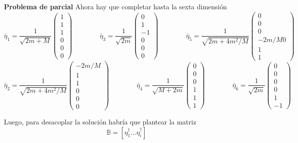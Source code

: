 \documentclass[10pt,oneside]{CBFT_book}
\begin{document}
\begin{ejemplo}{\bf Problema de parcial}
Ahora hay que completar hasta la sexta dimensión
\[
	\bar{\eta}_1 = \frac{1}{\sqrt{2m+M}} \begin{pmatrix} 1 \\ 1 \\ 1 \\ 0 \\ 0 \\ 0
	                                     \end{pmatrix} \qquad \qquad
	\bar{\eta}_3 = \frac{1}{\sqrt{2m}} \begin{pmatrix} 0 \\ 1 \\ -1 \\ 0 \\ 0 \\ 0
	                                     \end{pmatrix} \qquad \qquad
	\bar{\eta}_5 = \frac{1}{\sqrt{2m + 4m^2/M}} \begin{pmatrix} 0 \\ 0 \\ 0 \\ -2m/M0 \\ 1 \\ 1
	                                     \end{pmatrix}
\]
\[
	\bar{\eta}_2 = \frac{1}{\sqrt{2m+ 4m^2/M}} \begin{pmatrix} -2m/M \\ 1 \\ 1 \\ 0 \\ 0 \\ 0 
						\end{pmatrix} \qquad \qquad
	\bar{\eta}_4 = \frac{1}{\sqrt{M + 2m}} \begin{pmatrix} 0 \\ 0 \\ 0 \\ 1 \\ 1 \\ 1
	                                     \end{pmatrix} \qquad \qquad
	\bar{\eta}_6 = \frac{1}{\sqrt{2m}} \begin{pmatrix} 0 \\ 0 \\ 0 \\ 0 \\ 1 \\ -1
	                                     \end{pmatrix}
\] 
 
Luego, para desacoplar la solución habría que plantear la matriz
\[
	\mathbb{B} = [ \eta^\dagger_1 ... \eta_i^\dagger ]
\]
 
\end{ejemplo}
\end{document}
